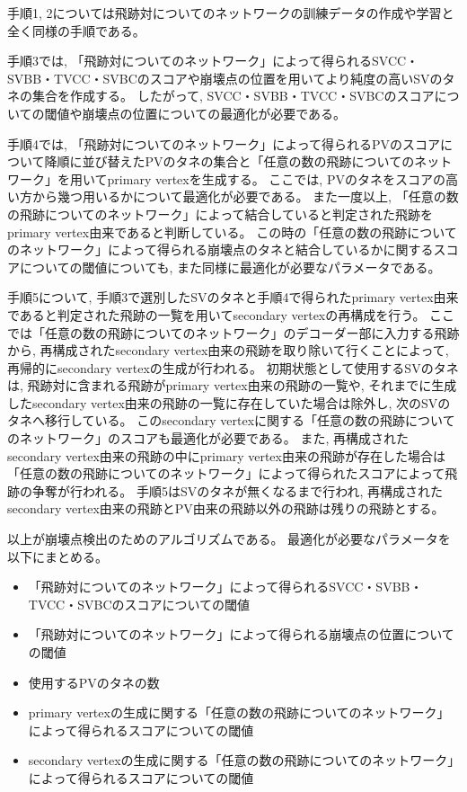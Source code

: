 手順1, 2については飛跡対についてのネットワークの訓練データの作成や学習と全く同様の手順である。

手順3では, 「飛跡対についてのネットワーク」によって得られるSVCC・SVBB・TVCC・SVBCのスコアや崩壊点の位置を用いてより純度の高いSVのタネの集合を作成する。
したがって, SVCC・SVBB・TVCC・SVBCのスコアについての閾値や崩壊点の位置についての最適化が必要である。

手順4では, 「飛跡対についてのネットワーク」によって得られるPVのスコアについて降順に並び替えたPVのタネの集合と「任意の数の飛跡についてのネットワーク」を用いてprimary vertexを生成する。
ここでは, PVのタネをスコアの高い方から幾つ用いるかについて最適化が必要である。
また一度以上, 「任意の数の飛跡についてのネットワーク」によって結合していると判定された飛跡をprimary vertex由来であると判断している。
この時の「任意の数の飛跡についてのネットワーク」によって得られる崩壊点のタネと結合しているかに関するスコアについての閾値についても, また同様に最適化が必要なパラメータである。

手順5について, 手順3で選別したSVのタネと手順4で得られたprimary vertex由来であると判定された飛跡の一覧を用いてsecondary vertexの再構成を行う。
ここでは「任意の数の飛跡についてのネットワーク」のデコーダー部に入力する飛跡から, 再構成されたsecondary vertex由来の飛跡を取り除いて行くことによって, 再帰的にsecondary vertexの生成が行われる。
初期状態として使用するSVのタネは, 飛跡対に含まれる飛跡がprimary vertex由来の飛跡の一覧や, それまでに生成したsecondary vertex由来の飛跡の一覧に存在していた場合は除外し, 次のSVのタネへ移行している。
このsecondary vertexに関する「任意の数の飛跡についてのネットワーク」のスコアも最適化が必要である。
また, 再構成されたsecondary vertex由来の飛跡の中にprimary vertex由来の飛跡が存在した場合は「任意の数の飛跡についてのネットワーク」によって得られたスコアによって飛跡の争奪が行われる。
手順5はSVのタネが無くなるまで行われ, 再構成されたsecondary vertex由来の飛跡とPV由来の飛跡以外の飛跡は残りの飛跡とする。

以上が崩壊点検出のためのアルゴリズムである。
最適化が必要なパラメータを以下にまとめる。

\begin{itemize}
 \item 「飛跡対についてのネットワーク」によって得られるSVCC・SVBB・TVCC・SVBCのスコアについての閾値
 \item 「飛跡対についてのネットワーク」によって得られる崩壊点の位置についての閾値
 \item 使用するPVのタネの数
 \item primary vertexの生成に関する「任意の数の飛跡についてのネットワーク」によって得られるスコアについての閾値
 \item secondary vertexの生成に関する「任意の数の飛跡についてのネットワーク」によって得られるスコアについての閾値
\end{itemize}


